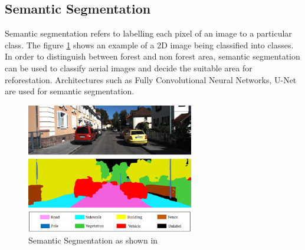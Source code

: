 \documentclass[rnd]{mas_proposal}
\begin{document}




\subsection{Semantic Segmentation}
Semantic segmentation refers to labelling each pixel of an image to a particular class. The figure \ref{fig:semantic_segmentation}  shows an example of a 2D image being classified into classes. In order to distinguish between forest and non forest area, semantic segmentation can be used to classify aerial images and decide the suitable area for reforestation. Architectures such as Fully Convolutional Neural Networks, U-Net are used for semantic segmentation.

\begin{figure}[htp] 
        \centering
        \includegraphics[width=0.65\textwidth]{images/semantic_segmentation.png}
    \caption{Semantic Segmentation as shown in \cite{semantic-segmentation}}%
    \label{fig:semantic_segmentation}%
\end{figure}
\newpage
\end{document}
